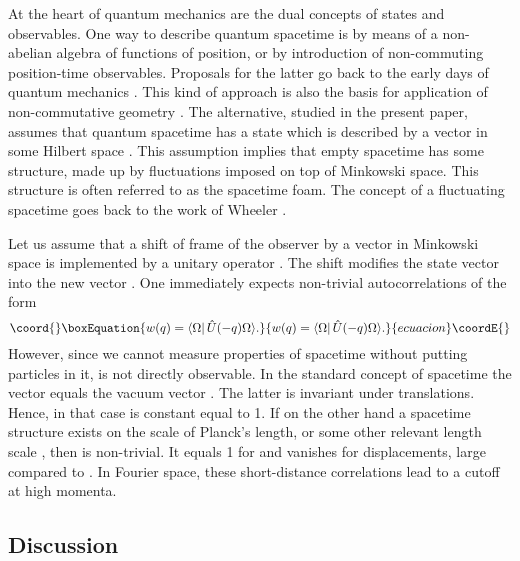 \documentclass[12pt,a4paper]{article}
\begin{document}
At the heart of quantum mechanics are the dual concepts of 
states and observables. One way to describe quantum spacetime is 
by means of a non-abelian algebra of functions of position, or 
by introduction of non-commuting position-time observables. 
Proposals for the latter go back to the early days of quantum 
mechanics \cite{SHS47}. This kind of approach is also the basis 
for application of non-commutative geometry \cite{CA94}. The 
alternative, studied in the present paper, assumes that quantum 
spacetime has a state which is described by a vector \myHighlight{$\Omega$}\coordHE{} in 
some Hilbert space \coordHE{}. This assumption implies that empty 
spacetime has some structure, made up by fluctuations imposed on 
top of Minkowski space. This structure is often referred to as 
the spacetime foam. The concept of a fluctuating spacetime goes 
back to the work of Wheeler \cite{WJA57}.

Let us assume that a shift of frame of the 
observer by a vector \coordHE{} in Minkowski space is implemented by a 
unitary operator \coordHE{}. The shift modifies the state vector \myHighlight{$\Omega$}\coordHE{} 
into the new vector \coordHE{}. One immediately expects
non-trivial autocorrelations of the form
\begin{equation}\coord{}\boxEquation{
w(q)=\langle\Omega|\,\hat U(-q)\Omega\rangle.
\label{autocor}
}{
w(q)=\langle\Omega|\,\hat U(-q)\Omega\rangle.
}{ecuacion}\coordE{}\end{equation}
However, since we cannot measure properties of spacetime without
putting particles in it, \coordHE{} is not directly observable.
In the standard concept of spacetime the vector \myHighlight{$\Omega$}\coordHE{}
equals the vacuum vector \coordHE{}. The latter is
invariant under translations. Hence, in that case \coordHE{}
is constant equal to 1.
If on the other hand a spacetime structure exists on
the scale of Planck's length, or some other relevant
length scale \coordHE{}, then \coordHE{} is non-trivial.
It equals 1 for \coordHE{} and vanishes for displacements,
large compared to \coordHE{}. In Fourier space,
these short-distance correlations lead to a cutoff
at high momenta.


\subsection{Discussion}
\end{document}
